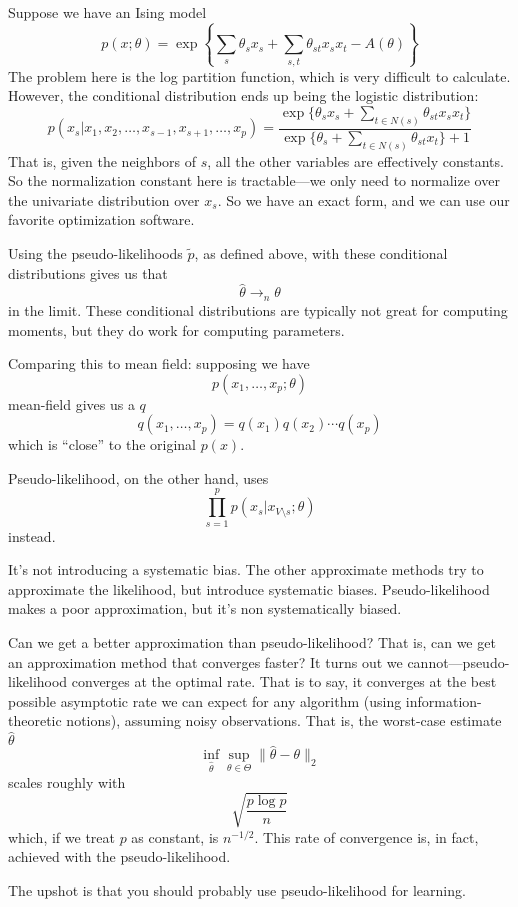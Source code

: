 \documentclass{article}
\begin{document}
Suppose we have an Ising model
$$
p(x;\theta) = 
\exp\left\{
	\sum_s \theta_s x_s +
	\sum_{s,t} \theta_{st} x_s x_t - A(\theta)
\right\}
$$
The problem here is the log partition function, which is very difficult to calculate.
However, the conditional distribution ends up being the logistic distribution:
$$
p(x_s | x_1, x_2, \ldots, x_{s-1}, x_{s+1}, \ldots, x_p)
=
\frac{
\exp
\{
	\theta_s x_s +
	\sum_{t\in N(s)} \theta_{st} x_s x_t
\}
}
{\exp\{ \theta_s + \sum_{t\in N(s)}\theta_{st}x_t  \}
	+ 1
}
$$
That is, given the neighbors of $s$, all the other variables are effectively constants.
So the normalization constant here is tractable---we only need to normalize over the univariate distribution over $x_s$.
So we have an exact form, and we can use our favorite optimization software.

Using the pseudo-likelihoods $\tilde p$, as defined above, with these conditional distributions  gives us that
$$
\hat\theta \rightarrow_n
\theta
$$
in the limit.
These conditional distributions are typically not great for computing moments, but they do work for computing parameters.



Comparing this to mean field:
supposing we have
$$
p(x_1, \ldots, x_p; \theta)
$$
mean-field gives us a $q$
$$
q(x_1, \ldots, x_p) = q(x_1) q(x_2) \cdots q(x_p)
$$
which is ``close'' to the original $p(x)$.

Pseudo-likelihood, on the other hand, uses
$$
\prod_{s=1}^p
p(x_s | x_{V\setminus s}; \theta)
$$
instead.

It's not introducing a systematic bias.
The other approximate methods try to approximate the likelihood, but introduce systematic biases.
Pseudo-likelihood makes a poor approximation, but it's non systematically biased.


Can we get a better approximation than pseudo-likelihood?
That is, can we get an approximation method that converges faster?
It turns out we cannot---pseudo-likelihood converges at the optimal rate.
That is to say, it converges at the best possible asymptotic rate we can expect for any algorithm (using information-theoretic notions), assuming noisy observations.
That is, the worst-case estimate $\hat\theta$
$$
\inf_{\hat\theta}
\sup_{\theta\in\Theta}
\|
	\hat\theta - \theta
\|_2
$$
scales roughly with
$$
\sqrt{\frac{p\log p}{n}}
$$
which, if we treat $p$ as constant, is $n^{-1/2}$.
This rate of convergence is, in fact, achieved with the pseudo-likelihood.

The upshot is that you should probably use pseudo-likelihood  for learning.
\end{document}
